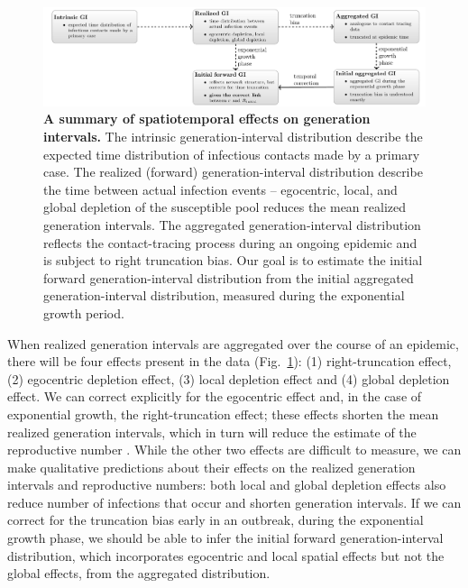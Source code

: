 \documentclass[12pt]{article}
\newcommand{\fref}[1]{Fig.~\ref{fig:#1}}
\begin{document}
\begin{figure}[!ht]
\includegraphics[width=\textwidth]{../fig/diagram.pdf}
\caption{
\textbf{A summary of spatiotemporal effects on generation intervals.}
The intrinsic generation-interval distribution describe the expected time distribution of infectious contacts made by a primary case.
The realized (forward) generation-interval distribution describe the time between actual infection events -- egocentric, local, and global depletion of the susceptible pool reduces the mean realized generation intervals.
The aggregated generation-interval distribution reflects the contact-tracing process during an ongoing epidemic and is subject to right truncation bias.
Our goal is to estimate the initial forward generation-interval distribution from the initial aggregated generation-interval distribution, measured during the exponential growth period.
}
\label{fig:diagram}
\end{figure}

When realized generation intervals are aggregated over the course of an epidemic, there will be four effects present in the data (\fref{diagram}): (1) right-truncation effect, (2) egocentric depletion effect, (3) local depletion effect and (4) global depletion effect.
We can correct explicitly for the egocentric effect and, in the case of exponential growth, the right-truncation effect;
these effects shorten the mean realized generation intervals, which in turn will reduce the estimate of the reproductive number \cite{wallinga2007generation, park2019practical}.
While the other two effects are difficult to measure, we can make qualitative predictions about their effects on the realized generation intervals and reproductive numbers: 
both local and global depletion effects also reduce number of infections that occur and shorten generation intervals.
If we can correct for the truncation bias early in an outbreak, during the exponential growth phase, we should be able to infer the initial forward generation-interval distribution, which incorporates egocentric and local spatial effects but not the global effects, from the aggregated distribution.
\end{document}
